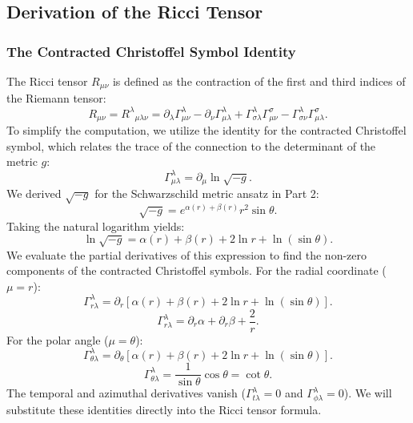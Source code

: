 \documentclass[11pt, a4paper]{report}
\begin{document}

\subsection{Derivation of the Ricci Tensor}

\subsubsection{The Contracted Christoffel Symbol Identity}
The Ricci tensor $R_{\mu\nu}$ is defined as the contraction of the first and third indices of the Riemann tensor:
\begin{equation}
R_{\mu\nu} = {R^\lambda}_{\mu\lambda\nu} = \partial_\lambda \Gamma^\lambda_{\mu\nu} - \partial_\nu \Gamma^\lambda_{\mu\lambda} + \Gamma^\lambda_{\sigma\lambda} \Gamma^\sigma_{\mu\nu} - \Gamma^\lambda_{\sigma\nu} \Gamma^\sigma_{\mu\lambda}.
\end{equation}
To simplify the computation, we utilize the identity for the contracted Christoffel symbol, which relates the trace of the connection to the determinant of the metric $g$:
\begin{equation}
\Gamma^\lambda_{\mu\lambda} = \partial_\mu \ln \sqrt{-g}.
\end{equation}
We derived $\sqrt{-g}$ for the Schwarzschild metric ansatz in Part 2:
\begin{equation}
\sqrt{-g} = e^{\alpha(r) + \beta(r)} r^2 \sin\theta.
\end{equation}
Taking the natural logarithm yields:
\begin{equation}
\ln \sqrt{-g} = \alpha(r) + \beta(r) + 2\ln r + \ln(\sin\theta).
\end{equation}
We evaluate the partial derivatives of this expression to find the non-zero components of the contracted Christoffel symbols. For the radial coordinate ($\mu = r$):
\begin{equation}
\Gamma^\lambda_{r\lambda} = \partial_r \left[ \alpha(r) + \beta(r) + 2\ln r + \ln(\sin\theta) \right].
\end{equation}
\begin{equation}
\Gamma^\lambda_{r\lambda} = \partial_r\alpha + \partial_r\beta + \frac{2}{r}.
\end{equation}
For the polar angle ($\mu = \theta$):
\begin{equation}
\Gamma^\lambda_{\theta\lambda} = \partial_\theta \left[ \alpha(r) + \beta(r) + 2\ln r + \ln(\sin\theta) \right].
\end{equation}
\begin{equation}
\Gamma^\lambda_{\theta\lambda} = \frac{1}{\sin\theta} \cos\theta = \cot\theta.
\end{equation}
The temporal and azimuthal derivatives vanish ($\Gamma^\lambda_{t\lambda} = 0$ and $\Gamma^\lambda_{\phi\lambda} = 0$). We will substitute these identities directly into the Ricci tensor formula.
\end{document}
